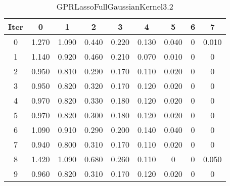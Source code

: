 \begin{table}
	\begin{center}
		\begin{tabular}{|c|c|c|c|c|c|c|c|c|}
			\hline
			Iter & 0 & 1 & 2 & 3 & 4 & 5 & 6 & 7 \\
			\hline
			0 & 1.270 & 1.090 & 0.440 & 0.220 & 0.130 & 0.040 & 0 & 0.010 \\
			\hline
			1 & 1.140 & 0.920 & 0.460 & 0.210 & 0.070 & 0.010 & 0 & 0 \\
			\hline
			2 & 0.950 & 0.810 & 0.290 & 0.170 & 0.110 & 0.020 & 0 & 0 \\
			\hline
			3 & 0.950 & 0.820 & 0.320 & 0.170 & 0.120 & 0.020 & 0 & 0 \\
			\hline
			4 & 0.970 & 0.820 & 0.330 & 0.180 & 0.120 & 0.020 & 0 & 0 \\
			\hline
			5 & 0.970 & 0.820 & 0.300 & 0.180 & 0.120 & 0.020 & 0 & 0 \\
			\hline
			6 & 1.090 & 0.910 & 0.290 & 0.200 & 0.140 & 0.040 & 0 & 0 \\
			\hline
			7 & 0.940 & 0.800 & 0.310 & 0.170 & 0.110 & 0.020 & 0 & 0 \\
			\hline
			8 & 1.420 & 1.090 & 0.680 & 0.260 & 0.110 & 0 & 0 & 0.050 \\
			\hline
			9 & 0.960 & 0.820 & 0.310 & 0.170 & 0.120 & 0.020 & 0 & 0 \\
			\hline
		\end{tabular}
	\end{center}
	\caption{GPRLassoFullGaussianKernel3.2}
\end{table}